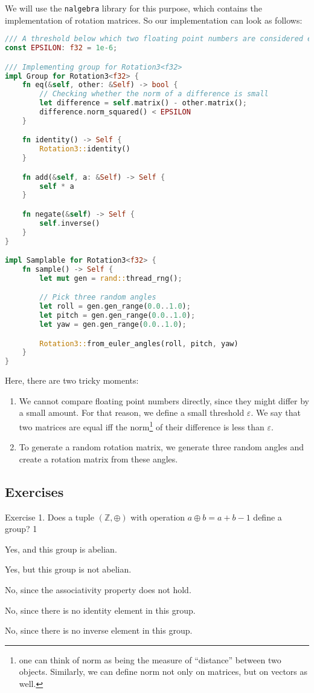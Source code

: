 \documentclass[../lecture-notes-148x210.tex]{subfiles}
\begin{document}
We will use the \texttt{nalgebra} library for this purpose, which contains the implementation of rotation matrices. So our implementation can look as follows:
\begin{lstlisting}[language=Rust]
/// A threshold below which two floating point numbers are considered equal.
const EPSILON: f32 = 1e-6;

/// Implementing group for Rotation3<f32>
impl Group for Rotation3<f32> {
    fn eq(&self, other: &Self) -> bool {
        // Checking whether the norm of a difference is small
        let difference = self.matrix() - other.matrix();
        difference.norm_squared() < EPSILON
    }

    fn identity() -> Self {
        Rotation3::identity()
    }

    fn add(&self, a: &Self) -> Self {
        self * a
    }

    fn negate(&self) -> Self {
        self.inverse()
    }
}

impl Samplable for Rotation3<f32> {
    fn sample() -> Self {
        let mut gen = rand::thread_rng();

        // Pick three random angles
        let roll = gen.gen_range(0.0..1.0);
        let pitch = gen.gen_range(0.0..1.0);
        let yaw = gen.gen_range(0.0..1.0);

        Rotation3::from_euler_angles(roll, pitch, yaw)
    }
}
\end{lstlisting}

Here, there are two tricky moments:
\begin{enumerate}
    \item We cannot compare floating point numbers directly, since they might differ by a small amount. For that reason, we define a small threshold $\varepsilon$. We say that two matrices are equal iff the norm\footnote{one can think of norm as being the measure of ``distance'' between two objects. Similarly, we can define norm not only on matrices, but on vectors as well.} of their difference is less than $\varepsilon$.
    \item To generate a random rotation matrix, we generate three random angles and create a rotation matrix from these angles.
\end{enumerate}

\newpage
\subsection{Exercises}

\begin{xexercise}
    {Exercise 1.}
    {Does a tuple $(\mathbb{Z},\oplus)$ with operation $a \oplus b = a + b - 1$ define a group?}
    {1}
    {
        \item Yes, and this group is abelian.
        \item Yes, but this group is not abelian.
        \item No, since the associativity property does not hold.
        \item No, since there is no identity element in this group.
        \item No, since there is no inverse element in this group.
    }
\end{xexercise}
\end{document}
